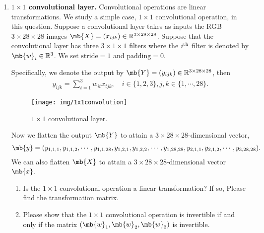 \begin{exercise}
\begin{enumerate}
        \item \textbf{$1\times1$ convolutional layer.} Convolutional operations are linear transformations. We study a simple case, $1\times1$ convolutional operation, in this question. Suppose a convolutional layer takes as inputs the RGB $3\times28\times28$ images $\mb{X}=(x_{ijk})\in\mathbb{R}^{3\times28\times28}$. Suppose that the convolutional layer has three $3\times1\times1$ filters where the $i^{\rm th}$ filter is denoted by $\mb{w}_{i}\in\mathbb{R}^3$. We set $\text{stride}=1$ and $\text{padding}=0$.

            Specifically, we denote the output by $\mb{Y}=(y_{ijk})\in\mathbb{R}^{3\times28\times28}$, then
            \begin{align*}
                y_{ijk}=\sum_{t=1}^3w_{it}x_{tjk}, \quad i\in\{1,2,3\}, j,k\in\{1,\cdots,28\}.
            \end{align*}

            \begin{figure}[H]
                \centering
                \texttt{[image: img/1x1convolution]}
                \caption{$1\times1$ convolutional layer.}
            \end{figure}

            Now we flatten the output $\mb{Y}$ to attain a $3\times28\times28$-dimensional vector,
            \begin{align*}
                \mb{y}=(y_{1,1,1},y_{1,1,2},\cdots, y_{1,1,28},y_{1,2,1},y_{1,2,2},
                \cdots,y_{1,28,28},y_{2,1,1},y_{2,1,2},\cdots, y_{3,28,28}).
            \end{align*}
            We can also flatten $\mb{X}$ to attain a $3\times28\times28$-dimensional vector $\mb{x}$.
            \begin{enumerate}
                \item Is the $1\times1$ convolutional operation a linear transformation? If so, Please find the transformation matrix.
                \item Please show that the $1\times1$ convolutional operation is  invertible if and only if the matrix $(\mb{w}_1,\mb{w}_2,\mb{w}_3)$ is invertible.


\end{enumerate}
\end{enumerate}
\end{exercise}
